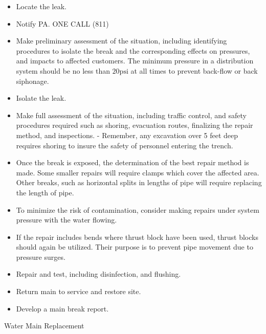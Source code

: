 \documentclass[10pt]{article}
\begin{document}
\begin{itemize}
  \item Locate the leak.

  \item Notify PA. ONE CALL (811)

  \item Make preliminary assessment of the situation, including identifying procedures to isolate the break and the corresponding effects on pressures, and impacts to affected customers. The minimum pressure in a distribution system should be no less than $20 \mathrm{psi}$ at all times to prevent back-flow or back siphonage.

  \item Isolate the leak.

  \item Make full assessment of the situation, including traffic control, and safety procedures required such as shoring, evacuation routes, finalizing the repair method, and inspections. - Remember, any excavation over 5 feet deep requires shoring to insure the safety of personnel entering the trench.

  \item Once the break is exposed, the determination of the best repair method is made. Some smaller repairs will require clamps which cover the affected area. Other breaks, such as horizontal splits in lengths of pipe will require replacing the length of pipe.

  \item To minimize the risk of contamination, consider making repairs under system pressure with the water flowing.

  \item If the repair includes bends where thrust block have been used, thrust blocks should again be utilized. Their purpose is to prevent pipe movement due to pressure surges.

  \item Repair and test, including disinfection, and flushing.

  \item Return main to service and restore site.

  \item Develop a main break report.

\end{itemize}
Water Main Replacement
\end{document}
